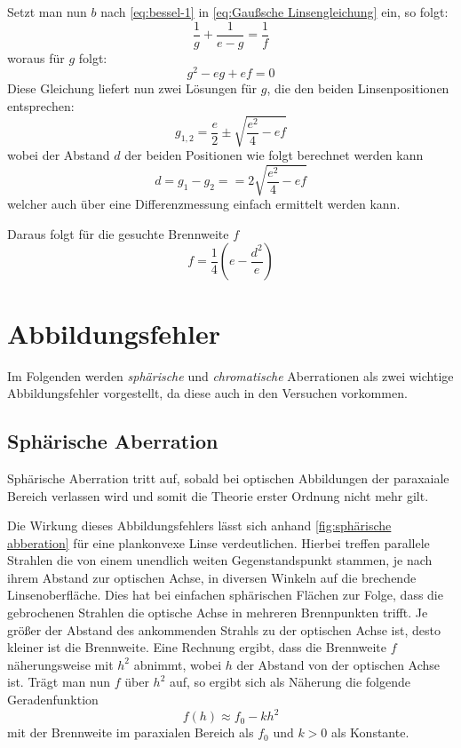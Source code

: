 \documentclass[../protokoll.tex]{subfiles}
\begin{document}
Setzt man nun $b$ nach \eqref{eq:bessel-1} in \cref{eq:Gaußsche Linsengleichung} ein, so folgt:
\begin{equation}\label{eq:bessel-2}
    \dfrac{1}{g} + \dfrac{1}{e-g} = \dfrac{1}{f}
\end{equation}
woraus für $g$ folgt:
\begin{equation}\label{eq:bessel-3}
    g^2 - eg + ef = 0
\end{equation}
Diese Gleichung liefert nun zwei Lösungen für $g$, die den beiden Linsenpositionen entsprechen:
\begin{equation}\label{eq:bessel-4}
    g_{1,2} = \dfrac{e}{2} \pm \sqrt{\dfrac{e^2}{4} - ef}
\end{equation}
wobei der Abstand $d$ der beiden Positionen wie folgt berechnet werden kann
\begin{equation}\label{eq:bessel-5}
    d = g_1 - g_2 = = 2 \sqrt{\dfrac{e^2}{4} - ef}
\end{equation}
welcher auch über eine Differenzmessung einfach ermittelt werden kann.

Daraus folgt für die gesuchte Brennweite $f$
\begin{equation}
    f = \dfrac{1}{4} \left( e - \dfrac{d^2}{e} \right)
\end{equation}

\section{Abbildungsfehler}
Im Folgenden werden \textsl{sphärische} und \textsl{chromatische} Aberrationen
als zwei wichtige Abbildungsfehler vorgestellt, da diese auch in den Versuchen
vorkommen.

\subsection{Sphärische Aberration}
Sphärische Aberration tritt auf, sobald bei optischen Abbildungen der paraxaiale
Bereich verlassen wird und somit die Theorie erster Ordnung nicht mehr gilt.

Die Wirkung dieses Abbildungsfehlers lässt sich anhand \cref{fig:sphärische abberation}
für eine plankonvexe Linse verdeutlichen. Hierbei treffen parallele Strahlen die von einem
unendlich weiten Gegenstandspunkt stammen, je nach ihrem Abstand zur optischen
Achse, in diversen Winkeln auf die brechende Linsenoberfläche. Dies hat bei
einfachen sphärischen Flächen zur Folge, dass die gebrochenen Strahlen die optische
Achse in mehreren Brennpunkten trifft. Je größer der Abstand des ankommenden Strahls
zu der optischen Achse ist, desto kleiner ist die Brennweite. Eine Rechnung ergibt, dass
die Brennweite $f$ näherungsweise mit $h^2$ abnimmt, wobei $h$ der Abstand von der
optischen Achse ist. Trägt man nun $f$ über $h^2$ auf, so ergibt sich als Näherung
die folgende Geradenfunktion
\begin{equation}
    f(h) \approx f_0 - kh^2
\end{equation}
mit der Brennweite im paraxialen Bereich als $f_0$ und $k > 0$ als Konstante.
\end{document}
